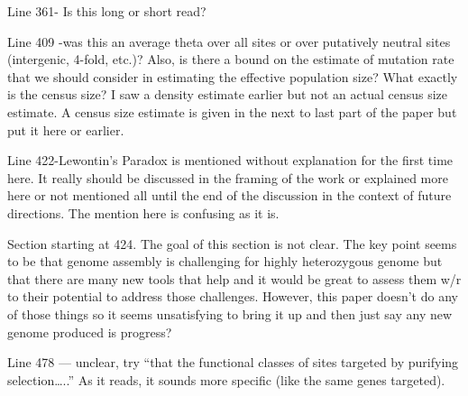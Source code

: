 
\begin{point}{} %
Line 361- Is this long or short read?
\end{point}


\begin{point}{} %
Line 409 -was this an average theta over all sites or over putatively
neutral sites (intergenic, 4-fold, etc.)? Also, is there a bound on the
estimate of mutation rate that we should consider in estimating the
effective population size? What exactly is the census size? I saw a
density estimate earlier but not an actual census size estimate. A census
size estimate is given in the next to last part of the paper but put it
here or earlier.
\end{point}


\begin{point}{} %
Line 422-Lewontin's Paradox is mentioned without explanation for the
first time here. It really should be discussed in the framing of the work
or explained more here or not mentioned all until the end of the
discussion in the context of future directions. The mention here is
confusing as it is.
\end{point}


\begin{point}{} %
Section starting at 424. The goal of this section is not clear. The key
point seems to be that genome assembly is challenging for highly
heterozygous genome but that there are many new tools that help and it
would be great to assess them w/r to their potential to address those
challenges. However, this paper doesn't do any of those things so it
seems unsatisfying to bring it up and then just say any new genome
produced is progress?
\end{point}


\begin{point}{} %
Line 478 --- unclear, try ``that the functional classes of sites targeted
by purifying selection\ldots..'' As it reads, it sounds more specific
(like the same genes targeted).
\end{point}

